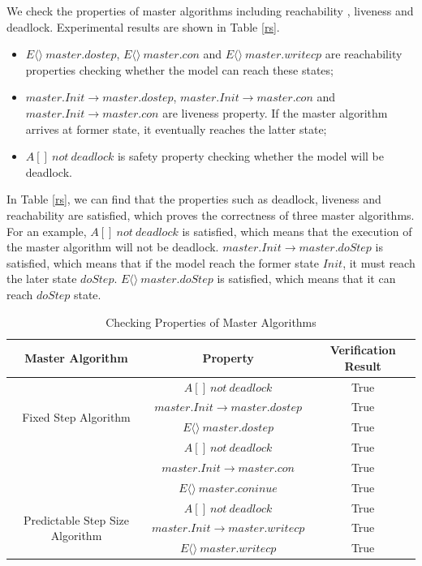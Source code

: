 We check the properties of master algorithms including reachability , liveness and deadlock. Experimental results are shown in Table \ref{rs}.

\begin{itemize}
\item
$E\langle\rangle~master.dostep$, $E\langle\rangle~master.con$ and $E\langle\rangle~master.writecp$ are reachability properties checking whether the model can reach these states;
\item
$master.Init \rightarrow master.dostep$, $master.Init \rightarrow master.con$ and $master.Init \rightarrow master.con$ are liveness property. If the master algorithm arrives at former state, it eventually reaches the latter state;
\item
$A[]~not~deadlock$ is safety property checking whether the model will be deadlock.
\end{itemize}

In Table \ref{rs}, we can find that the properties such as deadlock, liveness and reachability are satisfied,  which proves the correctness of three master algorithms. For an example, $A[]~not~deadlock$ is satisfied, which means that the execution of the master algorithm will not be deadlock. $master.Init \rightarrow master.doStep$ is satisfied, which means that if the model reach the former state $Init$, it must reach the later state $doStep$. $E\langle\rangle~master.doStep$ is satisfied, which means that it can reach $doStep$ state. 

\begin{table}
\caption{Checking Properties of Master Algorithms}
\centering
\begin{tabular}{c c c}
        \hline
        Master Algorithm & Property & Verification Result\\
        \hline
        \multirow{4}{5.0cm}{Fixed Step Algorithm}
                & $A[]~not~deadlock$ & True\\
                & $master.Init \rightarrow master.dostep$ & True\\
                & $E\langle\rangle~master.dostep$ & True\\

        \hline
        \multirow{4}{5.0cm}{Rollback Algorithm}
                & $A[]~not~deadlock$ & True\\
                & $master.Init \rightarrow master.con$ & True\\
                & $E\langle\rangle~master.coninue$ & True\\

        \hline
        \multirow{4}{5.0cm}{Predictable Step Size Algorithm}
                & $A[]~not~deadlock$ & True\\
                & $master.Init \rightarrow  master.writecp$ & True\\
                & $E\langle\rangle~master.writecp$ & True\\
        \hline
\end{tabular}
\label{ta_rs}
\end{table}